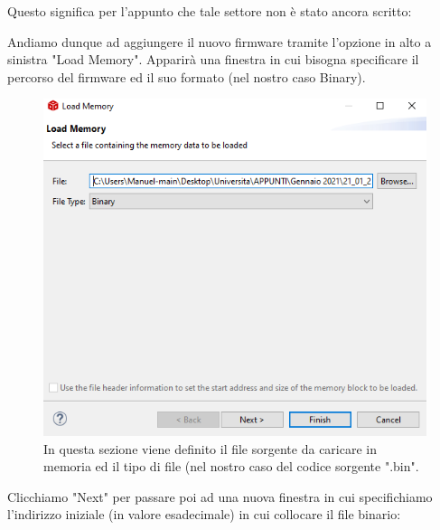 \documentclass[LaM,binding=0.6cm,oneside]{../sapthesis}
\begin{document}
Questo significa per l'appunto che tale settore non è stato ancora scritto:
\clearpage

Andiamo dunque ad aggiungere il nuovo firmware tramite l'opzione in alto a sinistra "Load Memory".
Apparirà una finestra in cui bisogna specificare il percorso del firmware ed il suo formato (nel nostro caso Binary).

\begin{figure}[htbp]
\centerline{\includegraphics[scale=0.75]{examples/LoadMemory1.PNG}}
\caption{In questa sezione viene definito il file sorgente da caricare in memoria ed il tipo di file (nel nostro caso del codice sorgente ".bin".}
\label{fig}
\end{figure}
\newline

\clearpage
Clicchiamo "Next" per passare poi ad una nuova finestra in cui specifichiamo l'indirizzo  iniziale (in valore esadecimale) in cui collocare il file binario:
\end{document}
